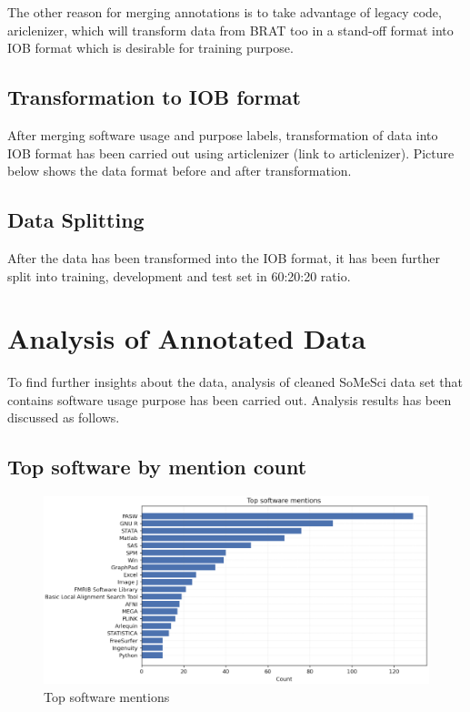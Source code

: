The other reason for merging annotations is to take advantage of legacy code, ariclenizer, which will transform data from BRAT too in a stand-off format  into IOB format which is desirable for training purpose. 

\subsection{Transformation to IOB format}
\label{subsec:dataset:preprocessing:Transformation}
After merging software usage and purpose labels, transformation of data into IOB format has been carried out using articlenizer (link to articlenizer). Picture below shows the data format before and after transformation. 

\subsection{Data Splitting}
\label{subsec:dataset:preprocessing:Splitting}
After the data has been transformed into the IOB format, it has been further split into training, development and test set in 60:20:20 ratio.


\section{Analysis of Annotated Data}
\label{sec:dataset:Analysis}

To find further insights about the data, analysis of cleaned SoMeSci data set that contains software usage purpose has been carried out. Analysis results has been discussed as follows. 



\subsection{Top software by mention count}
\label{subsec:dataset:Analysis:topsoftwareMention}

\begin{figure}[htbp]
	\centering
	\includegraphics[width=1\textwidth]{4.graphics/figures/analysisresults/1.Top software mentions}
	\caption{Top software mentions}
	\label{fig:chapter03:setup}
\end{figure}

